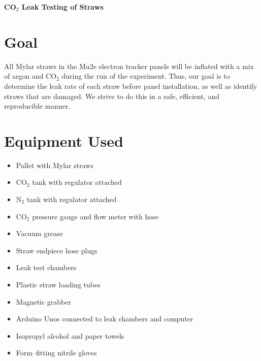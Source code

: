 \documentclass[12pt]{article}
\newenvironment{myitemize} %
{ \begin{itemize}
    \setlength{\itemsep}{4pt}
    \setlength{\parskip}{0pt}
    \setlength{\parsep}{0pt}     }
{ \end{itemize}                  }
\begin{document}
\begin{center}
{ \Huge \textbf{CO$_2$ Leak Testing of Straws} }
\end{center}

\section{Goal}
All Mylar straws in the Mu2e electron tracker panels will be inflated with a mix of argon and CO$_2$ during the run of the experiment. Thus, our goal is to determine the leak rate of each straw before panel installation, as well as identify straws that are damaged. We strive to do this in a safe, efficient, and reproducible manner.


\section{Equipment Used}
\begin{multicols}{2}
\begin{myitemize}
	\item Pallet with Mylar straws
	\item CO$_2$ tank with regulator attached
	\item N$_2$ tank with regulator attached
	\item CO$_2$ pressure gauge and flow meter with hose 
	\item Vacuum grease
	\item Straw endpiece hose plugs
	\item Leak test chambers
	\item Plastic straw loading tubes
	\item Magnetic grabber
	\item Arduino Unos connected to leak chambers and computer
	\item Isopropyl alcohol and paper towels
	\item Form--fitting nitrile gloves
\end{myitemize}
\end{multicols}

\end{document}
